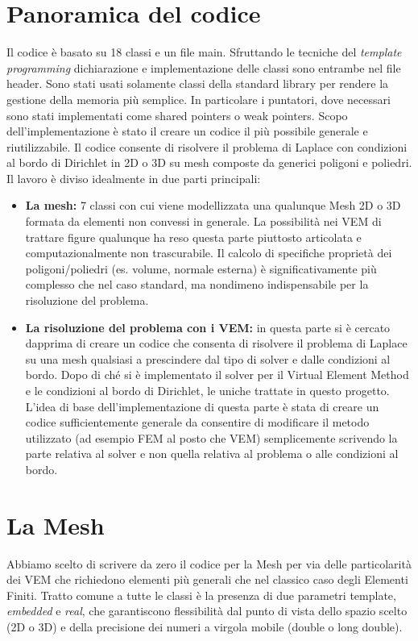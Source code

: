 \documentclass[oneside,12pt]{book}  %
\theoremstyle{plain}
\theoremstyle{definition}
\theoremstyle{remark}
\numberwithin{equation}{chapter} %
\begin{document}
\section{Panoramica del codice}
\label{sec:panoramica}
Il codice \`e basato su 18 classi e un file main. Sfruttando le
tecniche del \textit{template programming} dichiarazione e
implementazione delle classi sono entrambe nel file header.
Sono stati usati solamente classi della standard library per rendere
la gestione della memoria pi\`u semplice. In particolare i puntatori,
dove necessari sono stati implementati come shared pointers o weak
pointers. 
Scopo dell'implementazione \`e stato il creare un codice il pi\`u
possibile generale e riutilizzabile. Il codice consente di risolvere
il problema di Laplace con condizioni al bordo di Dirichlet in 2D o 3D
su mesh composte da generici poligoni e poliedri.
Il lavoro \`e diviso idealmente in due parti principali:
\begin{itemize}
\item
\textbf{La mesh:} 7 classi con cui viene modellizzata una qualunque
Mesh 2D o 3D formata da elementi non convessi in generale. La
possibilit\`a nei VEM di trattare figure qualunque ha
reso questa parte piuttosto articolata e computazionalmente non
trascurabile. Il calcolo di specifiche propriet\`a dei
poligoni/poliedri (es. volume, normale esterna) \`e significativamente
pi\`u complesso che nel caso standard, ma nondimeno indispensabile per
la risoluzione del problema.

\item
\textbf{La risoluzione del problema con i VEM:} in questa parte si \`e
cercato dapprima di creare un codice che consenta di risolvere il
problema di Laplace su una mesh qualsiasi a prescindere dal tipo di
solver e dalle condizioni al bordo. Dopo di ch\'e si \`e implementato
il solver per il Virtual Element Method e le condizioni al bordo di
Dirichlet, le uniche trattate in questo progetto.
L'idea di base dell'implementazione di questa parte \`e stata di
creare un codice sufficientemente generale da consentire di modificare
il metodo utilizzato (ad esempio FEM al posto che VEM) semplicemente
scrivendo la parte relativa al solver e non quella relativa al
problema o alle condizioni al bordo.

\end{itemize}


\section{La Mesh}
\label{sec:mesh}
Abbiamo scelto di scrivere da zero il codice per la Mesh per via delle
particolarit\`a dei VEM che richiedono elementi pi\`u generali che nel
classico caso degli Elementi Finiti. Tratto comune a tutte le classi
\`e la presenza di due parametri template, \textit{embedded} e
\textit{real}, che garantiscono flessibilit\`a dal punto di vista
dello spazio scelto (2D o 3D) e della precisione dei numeri a virgola
mobile (double o long double). 
\end{document}
